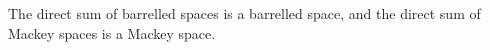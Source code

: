 The direct sum of barrelled spaces is a barrelled space, and the direct sum of Mackey spaces is a Mackey space.
